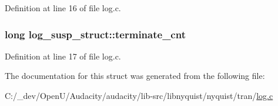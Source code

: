 Definition at line 16 of file log.\+c.

\subsubsection[{\texorpdfstring{terminate\+\_\+cnt}{terminate_cnt}}]{\setlength{\rightskip}{0pt plus 5cm}long log\+\_\+susp\+\_\+struct\+::terminate\+\_\+cnt}\hypertarget{structlog__susp__struct_ae5f1e3e1b83663c009657ca5ba54422e}{}\label{structlog__susp__struct_ae5f1e3e1b83663c009657ca5ba54422e}


Definition at line 17 of file log.\+c.



The documentation for this struct was generated from the following file\+:\begin{DoxyCompactItemize}
\item 
C\+:/\+\_\+dev/\+Open\+U/\+Audacity/audacity/lib-\/src/libnyquist/nyquist/tran/\hyperlink{log_8c}{log.\+c}\end{DoxyCompactItemize}
